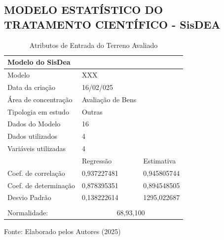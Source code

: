 \subsection{MODELO ESTATÍSTICO DO TRATAMENTO CIENTÍFICO - SisDEA}
\begin{table}[h!t]
	\centering
	\begin{threeparttable}
		\caption{Atributos de Entrada do Terreno Avaliado }
		\label{Tabela-variavedis}
		\begin{tabular}{lll}
			\toprule
			\multicolumn{3}{l}{Modelo do SisDea}                   \\\midrule
			Modelo                & XXX               &             \\
			Data da criação       & 16/02/025         &             \\
			Área de concentração  & Avaliação de Bens &             \\
			Tipologia em estudo   & Outras            &             \\
			Dados do Modelo       & 16                &             \\
			Dados utilizados      & 4                 &             \\
			Variáveis utilizadas  & 4                 &             \\
			& Regressão         & Estimativa  \\
			Coef. de correlação   & 0,937227481       & 0,945805744 \\
			Coef. de determinação & 0,878395351       & 0,894548505 \\
			Desvio Padrão         & 0,138222614       & 1295,022687 \\
			&                   &             \\
			Normalidade:          & \multicolumn{2}{c}{68,93,100}    \\\bottomrule
		\end{tabular}
		\begin{tablenotes}
			\item [{\normalsize Fonte:     Elaborado pelos Autores (2025)}]  
		\end{tablenotes}
	\end{threeparttable}
\end{table}

